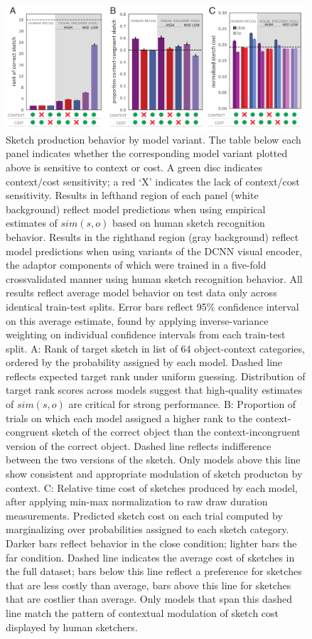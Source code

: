 \documentclass[9pt,twocolumn,twoside]{pnas-new}
\begin{document}
\begin{figure}[htbp]
\centering
\includegraphics[width=0.99\textwidth]{figures/5_model_results_2.pdf}
\caption{Sketch production behavior by model variant. The table below each panel indicates whether the corresponding model variant plotted above is sensitive to context or cost. A green disc indicates context/cost sensitivity; a red `X' indicates the lack of context/cost sensitivity. Results in lefthand region of each panel (white background) reflect model predictions when using empirical estimates of $sim(s,o)$ based on human sketch recognition behavior. Results in the righthand region (gray background) reflect model predictions when using variants of the DCNN visual encoder, the adaptor components of which were trained in a five-fold crossvalidated manner using human sketch recognition behavior. All results reflect average model behavior on test data only across identical train-test splits. Error bars reflect 95\% confidence interval on this average estimate, found by applying inverse-variance weighting on individual confidence intervals from each train-test split. A: Rank of target sketch in list of 64 object-context categories, ordered by the probability assigned by each model. Dashed line reflects expected target rank under uniform guessing. Distribution of target rank scores across models suggest that high-quality estimates of $sim(s,o)$ are critical for strong performance. B: Proportion of trials on which each model assigned a higher rank to the context-congruent sketch of the correct object than the context-incongruent version of the correct object. Dashed line reflects indifference between the two versions of the sketch. Only models above this line show consistent and appropriate modulation of sketch producton by context. C: Relative time cost of sketches produced by each model, after applying min-max normalization to raw draw duration measurements. Predicted sketch cost on each trial computed by marginalizing over probabilities assigned to each sketch category. Darker bars reflect behavior in the close condition; lighter bars the far condition. Dashed line indicates the average cost of sketches in the full dataset; bars below this line reflect a preference for sketches that are less costly than average, bars above this line for sketches that are costlier than average. Only models that span this dashed line match the pattern of contextual modulation of sketch cost displayed by human sketchers.}
\label{model_results}
\end{figure}
\end{document}
